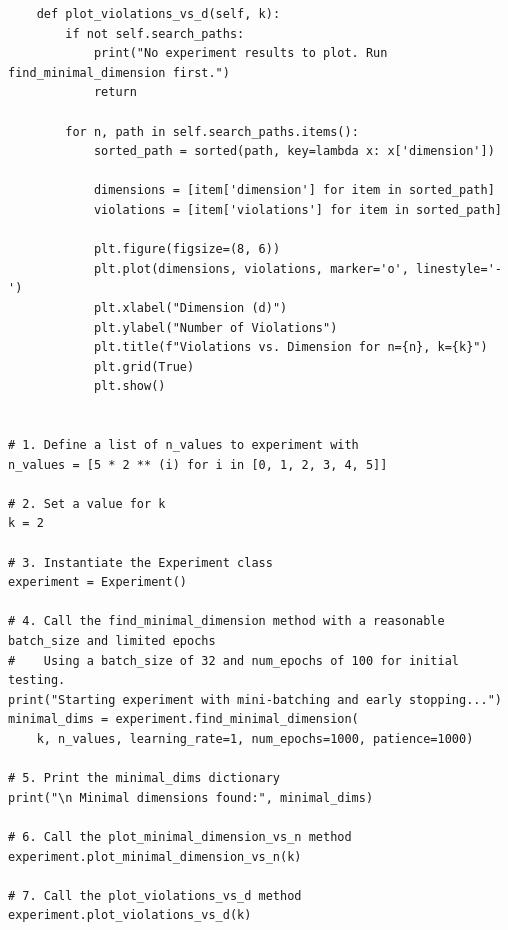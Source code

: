 \begin{lstlisting}
    def plot_violations_vs_d(self, k):
        if not self.search_paths:
            print("No experiment results to plot. Run find_minimal_dimension first.")
            return

        for n, path in self.search_paths.items():
            sorted_path = sorted(path, key=lambda x: x['dimension'])

            dimensions = [item['dimension'] for item in sorted_path]
            violations = [item['violations'] for item in sorted_path]

            plt.figure(figsize=(8, 6))
            plt.plot(dimensions, violations, marker='o', linestyle='-')
            plt.xlabel("Dimension (d)")
            plt.ylabel("Number of Violations")
            plt.title(f"Violations vs. Dimension for n={n}, k={k}")
            plt.grid(True)
            plt.show()


# 1. Define a list of n_values to experiment with
n_values = [5 * 2 ** (i) for i in [0, 1, 2, 3, 4, 5]]

# 2. Set a value for k
k = 2

# 3. Instantiate the Experiment class
experiment = Experiment()

# 4. Call the find_minimal_dimension method with a reasonable batch_size and limited epochs
#    Using a batch_size of 32 and num_epochs of 100 for initial testing.
print("Starting experiment with mini-batching and early stopping...")
minimal_dims = experiment.find_minimal_dimension(
    k, n_values, learning_rate=1, num_epochs=1000, patience=1000)

# 5. Print the minimal_dims dictionary
print("\n Minimal dimensions found:", minimal_dims)

# 6. Call the plot_minimal_dimension_vs_n method
experiment.plot_minimal_dimension_vs_n(k)

# 7. Call the plot_violations_vs_d method
experiment.plot_violations_vs_d(k)
\end{lstlisting}
